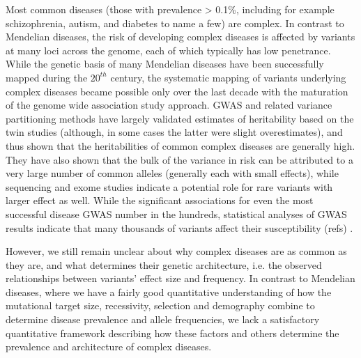 \documentclass[11pt]{article}
\newcommand{\jb}[1]{{\color{blue} (#1)} }
\begin{document}
Most common diseases (those with prevalence > 0.1\%, including for example schizophrenia, autism, and diabetes to name a few) are complex. In contrast to Mendelian diseases, the risk of developing complex diseases is affected by variants at many loci across the genome, each of which typically has low penetrance. While the genetic basis of many Mendelian diseases have been successfully mapped during the $20^{th}$ century, the systematic mapping of variants underlying complex diseases became possible only over the last decade with the maturation of the genome wide association study approach.\cite{Risch:1996ub,Visscher:2012je,get_more} GWAS and related variance partitioning methods have largely validated estimates of heritability based on the twin studies (although, in some cases the latter were slight overestimates), and thus shown that the heritabilities of common complex diseases are generally high. They have also shown that the bulk of the variance in risk can be attributed to a very large number of common
alleles (generally each with small effects),\cite{Consortium:2009ef,Lee:2012iu,Loh:2015hz,Ripke:2014eb,Lee:2012iu} while sequencing and exome studies indicate a potential role for rare variants with larger effect as well.\cite{Richards:2016cs, Genovese:2016fv, Purcell:2014gw} While the significant associations for even the most successful disease GWAS number in the hundreds, statistical analyses of GWAS results indicate that many thousands of variants affect their susceptibility \jb{refs}.

However, we still remain unclear about why complex diseases are as common as they are, and what determines their genetic architecture, i.e. the observed relationships between variants’ effect size and frequency. In contrast to Mendelian diseases, where we have a fairly good quantitative understanding of how the mutational target size, recessivity, selection and demography combine to determine disease prevalence and allele frequencies, we lack a satisfactory quantitative framework describing how these factors and others determine the prevalence and architecture of complex diseases. 



\end{document}
